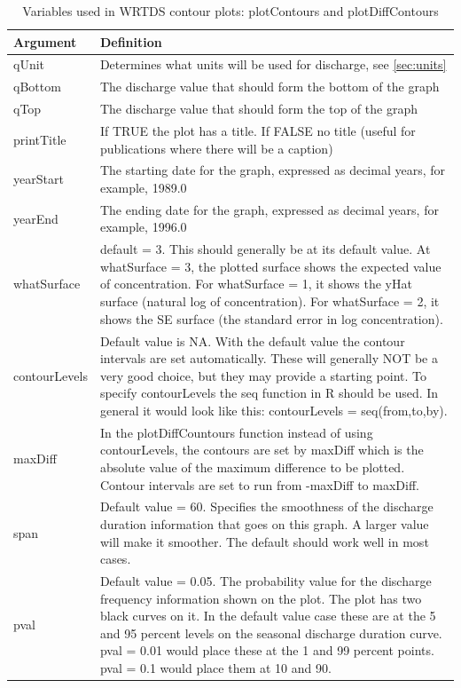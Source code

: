 \documentclass[a4paper,11pt]{article}\usepackage[]{graphicx}\usepackage[]{color}
\begin{document}
\begin{table}[ht]
\caption{Variables used in WRTDS contour plots: plotContours and plotDiffContours \label{tab:wrtdsContourVariables}}
\begin{tabularx}{\textwidth}{lX}
\hline
  \textbf{Argument} & \textbf{Definition} \\
\hline
qUnit & Determines what units will be used for discharge, see \ref{sec:units}\\
qBottom & The discharge value that should form the bottom of the graph \\
qTop & The discharge value that should form the top of the graph \\
printTitle & If TRUE the plot has a title.  If FALSE no title (useful for publications where there will be a caption) \\
yearStart & The starting date for the graph, expressed as decimal years, for example, 1989.0 \\
yearEnd & The ending date for the graph, expressed as decimal years, for example, 1996.0 \\
whatSurface & default = 3.  This should generally be at its default value.  At whatSurface = 3, the plotted surface shows the expected value of concentration.  For whatSurface = 1, it shows the yHat surface (natural log of concentration).  For whatSurface = 2, it shows the SE surface (the standard error in log concentration).    \\
contourLevels & Default value is NA.  With the default value the contour intervals are set automatically.  These will generally NOT be a very good choice, but they may provide a starting point.  To specify contourLevels the seq function in R should be used.  In general it would look like this: contourLevels = seq(from,to,by).\\
maxDiff & In the plotDiffCountours function instead of using contourLevels, the contours are set by maxDiff which is the absolute value of the maximum difference to be plotted.  Contour intervals are set to run from -maxDiff to maxDiff.\\
span & Default value = 60.  Specifies the smoothness of the discharge duration information that goes on this graph.  A larger value will make it smoother.  The default should work well in most cases.\\
pval & Default value = 0.05.  The probability value for the discharge frequency information shown on the plot.  The plot has two black curves on it.  In the default value case these are at the 5 and 95 percent levels on the seasonal discharge duration curve.  pval = 0.01 would place these at the 1 and 99 percent points.  pval = 0.1 would place them at 10  and 90.\\

\end{tabularx}
\end{table}
\end{document}
